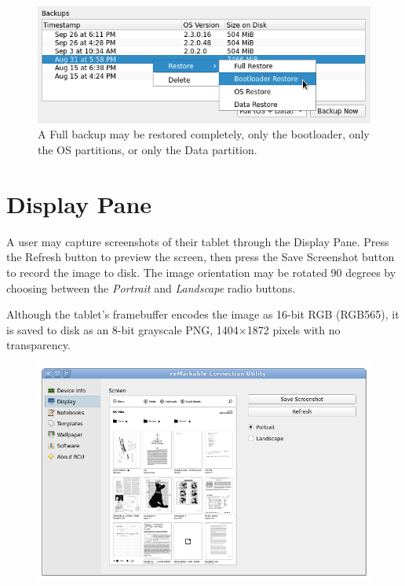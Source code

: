 \documentclass{memoir}
\begin{document}
{\begin{figure}[h]
  \centering
  \includegraphics[width=\linewidth]{images/backup-restore.png}
  \caption{A Full backup may be restored completely, only the bootloader, only the OS partitions, or only the Data partition.}
  \label{fig:backuprestore}
\end{figure}

\vfill

\newpage
\section{Display Pane}
\label{sec:displaypane}
A user may capture screenshots of their tablet through the Display Pane. Press the Refresh button to preview the screen, then press the Save Screenshot button to record the image to disk. The image orientation may be rotated 90 degrees by choosing between the \textit{Portrait} and \textit{Landscape} radio buttons.

Although the tablet's framebuffer encodes the image as 16-bit RGB (RGB565), it is saved to disk as an 8-bit grayscale PNG, 1404$\times$1872 pixels with no transparency.

\vfill
\begin{figure}[h]
  \centering
  \includegraphics[width=\linewidth]{images/display.png}
  \caption{}
  \label{fig:displaypane}
\end{figure}


}
\end{document}
